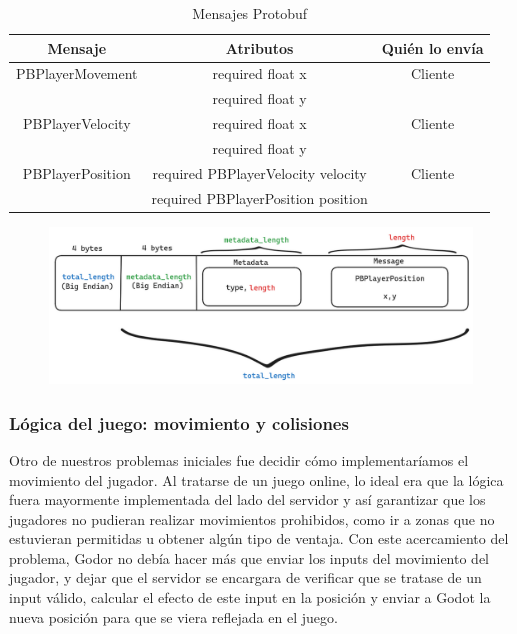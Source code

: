 \begin{table}[htbp]
    \centering
    
    \begin{tabular}{|c|c|c|}
        \hline
        \textbf{Mensaje} & \textbf{Atributos} & \textbf{Quién lo envía} \\
        \hline
        PBPlayerMovement & required float x & Cliente \\
                         & required float y & \\
        \hline
        PBPlayerVelocity & required float x & Cliente \\
                         & required float y & \\
        \hline
        PBPlayerPosition & required PBPlayerVelocity velocity & Cliente \\
                         & required PBPlayerPosition position & \\
        \hline
    \end{tabular}
    \caption{Mensajes Protobuf}
    \label{tab:my_table}
\end{table}


\begin{figure}[htbp]
    \centering
    \includegraphics[width=1.0\textwidth]{../assets/protobuf.png}
\end{figure}

\subsubsection{Lógica del juego: movimiento y colisiones}
\noindent Otro de nuestros problemas iniciales fue decidir cómo implementaríamos el movimiento del 
jugador. Al tratarse de un juego online, lo ideal era que la lógica fuera mayormente implementada del 
lado del servidor y así garantizar que los jugadores no pudieran realizar movimientos prohibidos, como 
ir a zonas que no estuvieran permitidas u obtener algún tipo de ventaja. Con este acercamiento del 
problema, Godor no debía hacer más que enviar los inputs del movimiento del jugador, y dejar que el 
servidor se encargara de verificar que se tratase de un input válido, calcular el efecto de este 
input en la posición y enviar a Godot la nueva posición para que se viera reflejada en el juego.


